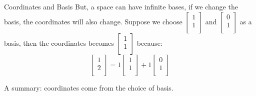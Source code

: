 \documentclass{beamer}
\begin{document}
\begin{frame}{Coordinates and Basis}
\vspace{3pt}
But, a space can have infinite bases, if we change the basis, the coordinates will also change. Suppose we choose $\left[ \begin{array}{c}
    1\\
    1\\
\end{array} \right]$ and $\left[ \begin{array}{c}
    0\\
    1\\
\end{array} \right]$ as a basis, then the coordinates becomes $\left[ \begin{array}{c}
    1\\
    1\\
\end{array} \right]$ because:
\begin{equation*}
    \left[ \begin{array}{c}
        1\\
        2\\
    \end{array} \right] =1\left[ \begin{array}{c}
        1\\
        1\\
    \end{array} \right] +1\left[ \begin{array}{c}
        0\\
        1\\
    \end{array} \right]
\end{equation*}

A summary: coordinates come from the choice of basis.
\end{frame}
\end{document}
